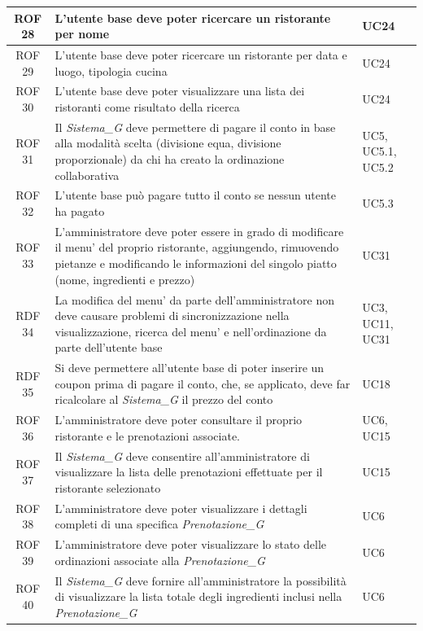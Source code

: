 \documentclass[12pt, oneside]{article}
\begin{document}
\begin{longtable}{|c|p{14cm}|p{2cm}|}
    \hline
    ROF 28 & L'utente base deve poter ricercare un ristorante per nome & UC24 \\
    \hline
    ROF 29 & L'utente base deve poter ricercare un ristorante per data e luogo, tipologia cucina & UC24 \\
    \hline
    ROF 30 & L'utente base deve poter visualizzare una lista dei ristoranti come risultato della ricerca & UC24 \\
    \hline
    ROF 31 & Il \textit{Sistema_G} deve permettere di pagare il conto in base alla modalità scelta (divisione equa, divisione proporzionale) da chi ha creato la ordinazione collaborativa & UC5, UC5.1, UC5.2 \\
    \hline
    ROF 32 & L'utente base può pagare tutto il conto se nessun utente ha pagato & UC5.3 \\
    \hline
    ROF 33 & L'amministratore deve poter essere in grado di modificare il menu' del proprio ristorante, aggiungendo, rimuovendo pietanze e modificando le informazioni del singolo piatto (nome, ingredienti e prezzo) & UC31 \\
    \hline
    RDF 34 & La modifica del menu' da parte dell'amministratore non deve causare problemi di sincronizzazione nella visualizzazione, ricerca del menu' e nell'ordinazione da parte dell'utente base &  UC3, UC11, UC31 \\
    \hline
    RDF 35 & Si deve permettere all'utente base di poter inserire un coupon prima di pagare il conto, che, se applicato, deve far ricalcolare al \textit{Sistema_G} il prezzo del conto & UC18 \\
    \hline
    ROF 36 & L'amministratore deve poter consultare il proprio ristorante e le prenotazioni associate. & UC6, UC15 \\
    \hline
    ROF 37 & Il \textit{Sistema_G} deve consentire all'amministratore di visualizzare la lista delle prenotazioni effettuate per il ristorante selezionato & UC15 \\
    \hline
    ROF 38 & L'amministratore deve poter visualizzare i dettagli completi di una specifica \textit{Prenotazione_G} & UC6 \\
    \hline
    ROF 39 & L'amministratore deve poter visualizzare lo stato delle ordinazioni associate alla \textit{Prenotazione_G} & UC6 \\
    \hline
    ROF 40 & Il \textit{Sistema_G} deve fornire all'amministratore la possibilità di visualizzare la lista totale degli ingredienti inclusi nella \textit{Prenotazione_G} & UC6 \\

\end{longtable}
\end{document}
